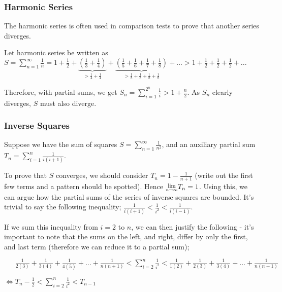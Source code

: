 \documentclass[a4paper, 12pt]{article}
\newcommand{\limit}[2]{\raisebox{0.5ex}{\scalebox{0.8}{$\displaystyle{\lim_{#1 \to #2}}$}}}
\newcommand{\summation}[3]{\sum\limits_{#1}^{#2} #3}
\begin{document}
            \subsubsection*{Harmonic Series}
                The harmonic series is often used in comparison tests to prove that another series diverges.
                \smallskip

                Let harmonic series be written as $S = \summation{n = 1}{\infty}{\frac{1}{n}} = 1 + \frac{1}{2} + \underbrace{(\textstyle\frac{1}{3} + \frac{1}{4})}_{> \frac{1}{4} + \frac{1}{4}} + \underbrace{(\textstyle\frac{1}{5} + \frac{1}{6} + \frac{1}{7} + \frac{1}{8})}_{> \frac{1}{8} + \frac{1}{8} + \frac{1}{8} + \frac{1}{8}} + ... > 1 + \frac{1}{2} + \frac{1}{2} + \frac{1}{2} + ...$
                \smallskip

                Therefore, with partial sums, we get $S_n = \summation{i = 1}{2^n}{\frac{1}{i}} > 1 + \frac{n}{2}$. As $S_n$ clearly diverges, $S$ must also diverge.
            \subsubsection*{Inverse Squares}
                Suppose we have the sum of squares $S = \summation{n = 1}{\infty}{\frac{1}{n^2}}$, and an auxiliary partial sum $T_n = \summation{i = 1}{n}{\frac{1}{i(i + 1)}}$.
                \smallskip

                To prove that $S$ converges, we should consider $T_n = 1 - \frac{1}{n + 1}$ (write out the first few terms and a pattern should be spotted). Hence $\limit{n}{\infty}T_n = 1$. Using this, we can argue how the partial sums of the series of inverse squares are bounded. It's trivial to say the following inequality; $\frac{1}{i(i + 1)} < \frac{1}{i^2} < \frac{1}{i(i - 1)}$.
                \smallskip

                If we sum this inequality from $i = 2$ to $n$, we can then justify the following - it's important to note that the sums on the left, and right, differ by only the first, and last term (therefore we can reduce it to a partial sum);
                \medskip

                $\phantom{\Leftrightarrow} \frac{1}{2(3)} + \frac{1}{3(4)} + \frac{1}{4(5)} + ... + \frac{1}{n(n + 1)} < \summation{i = 2}{n}{\frac{1}{i^2}} < \frac{1}{1(2)} + \frac{1}{2(3)} + \frac{1}{3(4)} + ... + \frac{1}{n(n - 1)}$
                \smallskip

                $\Leftrightarrow T_n - \frac{1}{2} < \summation{i = 2}{n}{\frac{1}{i^2}} < T_{n - 1}$
                \smallskip
\end{document}
